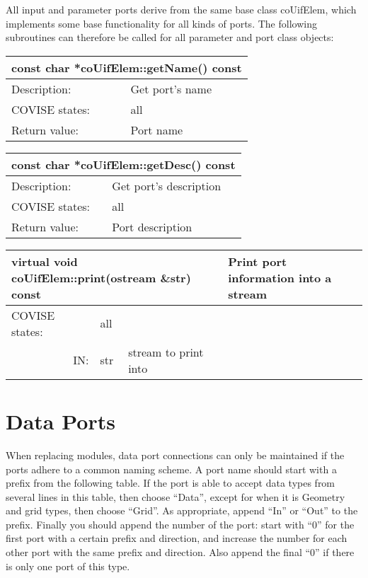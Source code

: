 All input and parameter ports derive from the same base class coUifElem, which implements
some base functionality for all kinds of ports. The following subroutines can therefore 
be called for all parameter and port class objects: 

\begin{longtable}{|p{4cm}|p{10cm}|}
\hline
\multicolumn{2}{|p{13.5cm}|}{\bf const char *coUifElem::getName() const} \\
\hline
{Description:}   & {Get port's name} \\
\hline
{COVISE states:} & {all} \\
\hline
{Return value:}  & {Port name} \endhead
\hline
\end{longtable}

\begin{longtable}{|p{4cm}|p{10cm}|}
\hline
\multicolumn{2}{|p{13.5cm}|}{\bf const char *coUifElem::getDesc() const} \\
\hline
{Description:}   & {Get port's description} \\
\hline
{COVISE states:} & {all} \\
\hline
{Return value:}  & {Port description} \endhead
\hline
\end{longtable}

\begin{longtable}{|p{4cm}|p{2.5cm}|p{7cm}|}
\hline
\multicolumn{3}{|p{13.5cm}|}{\bf virtual void coUifElem::print(ostream \&str) const} \endhead
\hline
{Description:}   & 
                       \multicolumn{2}{|p{9.5cm}|}{Print port information into a stream} \\
\hline
{COVISE states:} & \multicolumn{2}{|p{9.5cm}|}{all} \\
\hline
\multicolumn{1}{|r|}{IN:}  & {str} & 
                                  {stream to print into} \\
\hline
\end{longtable}


\section{Data Ports}

When replacing modules, data port connections can only be maintained if the ports adhere to a
common naming scheme.
A port name should start with a prefix from the following table.
If the port is able to accept data types from several lines in this table, then choose ``Data'',
except for when it is Geometry and grid types, then choose ``Grid''.
As appropriate, append ``In'' or ``Out'' to the prefix.
Finally you should append the number of the port: start with ``0'' for the first port with a
certain prefix and direction, and increase the number for each other port with the same prefix
and direction.
Also append the final ``0'' if there is only one port of this type.


